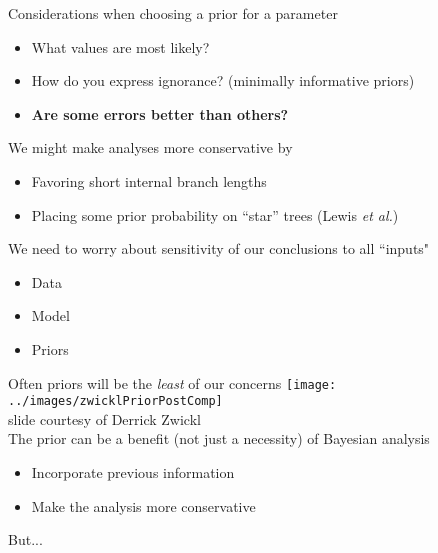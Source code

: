 \documentclass{seminar}
\begin{document}
\begin{slide}
\newslide
\Large	Considerations when choosing a prior for a parameter
\begin{itemize}
	\item What values are most likely?
	\item How do you express ignorance? (minimally informative priors)
	\item {\bf Are some errors better than others?	}
\end{itemize}
\newslide
{}
\newslide
{}
\newslide
\Large We might make analyses more conservative by 
\begin{itemize}
	\item Favoring short internal branch lengths
	\item Placing some prior probability on ``star'' trees (Lewis {\em et al.})
\end{itemize}
\newslide
	\Large We need to worry about sensitivity of our conclusions to all ``inputs"
\begin{itemize}
	\item Data
	\item Model
	\item Priors
\end{itemize}
Often priors will be the {\em least} of our concerns
\newslide
\texttt{[image: ../images/zwicklPriorPostComp]}\\
\tiny slide courtesy of Derrick Zwickl\\
\newslide
	\Large The prior can be a benefit (not just a necessity) of Bayesian analysis
\begin{itemize}
	\item Incorporate previous information
	\item Make the analysis more conservative\\[20pt]
\end{itemize}
But...
\newslide


\end{slide}
\end{document}
